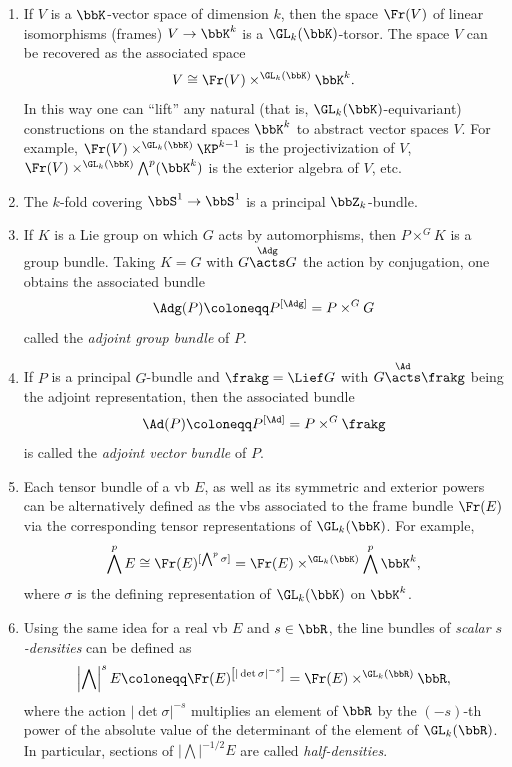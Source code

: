 \begin{example}\label{ex associated bundles}
    \begin{enumerate}
        \item If $V$ is a $\bbK$-vector space of dimension $k$, then the space $\Fr(V)$ of linear isomorphisms (frames) $V\to \bbK^k$ is a $\GL_k(\bbK)$-torsor. The space $V$ can be recovered as the associated space
        \[V\cong \Fr(V)\times^{\GL_k(\bbK)} \bbK^k.\]
        In this way one can ``lift'' any natural (that is, $\GL_k(\bbK)$-equivariant) constructions on the standard spaces $\bbK^k$ to abstract vector spaces $V$. For example, $\Fr(V)\times^{\GL_k(\bbK)} \KP^{k-1}$ is the projectivization of $V$, $\Fr(V)\times^{\GL_k(\bbK)}\bigwedge^p(\bbK^k)$ is the exterior algebra of $V$, etc.
        
        \item The $k$-fold covering $\bbS^1\to \bbS^1$ is a principal $\bbZ_k$-bundle.
        
        \item If $K$ is a Lie group on which $G$ acts by automorphisms, then $P\times^G K$ is a group bundle. Taking $K=G$ with $G\overset{\Adg}{\acts}G$ the action by conjugation, one obtains the associated bundle \[\Adg(P)\coloneqq P^{[\Adg]}=P\times^G G\]
        called the \emph{adjoint group bundle} of $P$.

        \item If $P$ is a principal $G$-bundle and $\frakg=\Lief G$ with $G\overset{\Ad}{\acts}\frakg$ being the adjoint representation, then the associated bundle \[\Ad(P)\coloneqq P^{[\Ad]}=P\times^G \frakg\] is called the \emph{adjoint vector bundle} of $P$.
       
        \item Each tensor bundle of a \gls{vb} $E$, as well as its symmetric and exterior powers can be alternatively defined as the \glspl{vb} associated to the frame bundle $\Fr(E)$ via the corresponding tensor representations of $\GL_k(\bbK)$. For example, \[\bigwedge^p E\cong \Fr(E)^{[\bigwedge^p \sigma]}=\Fr(E)\times^{\GL_k(\bbK)} \bigwedge^p \bbK^k,\]
        where $\sigma$ is the defining representation of $\GL_k(\bbK)$ on $\bbK^k$. 
        
        \item Using the same idea for a real \gls{vb} $E$ and $s\in\bbR$, the line bundles of \emph{scalar $s$-densities} can be defined as
        \[\left|\bigwedge\right|^s E\coloneqq \Fr(E)^{\left[|\det \sigma|^{-s}\right]}=\Fr(E)\times^{\GL_k(\bbR)}\bbR,\]
        where the action $|\det \sigma|^{-s}$ multiplies an element of $\bbR$ by the $(-s)$-th power of the absolute value of the determinant of the element of $\GL_k(\bbR)$. In particular, sections of $\left|\bigwedge\right|^{-1/2}E$ are called \emph{half-densities}.
        

\end{enumerate}
\end{example}
